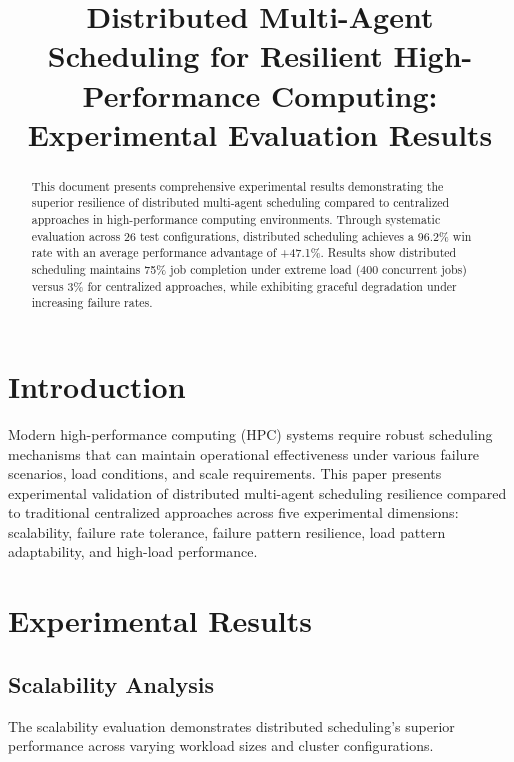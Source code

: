 \documentclass[conference]{IEEEtran}
\begin{document}
\title{Distributed Multi-Agent Scheduling for Resilient High-Performance Computing: Experimental Evaluation Results}

\author{
}

\maketitle

\begin{abstract}
This document presents comprehensive experimental results demonstrating the superior resilience of distributed multi-agent scheduling compared to centralized approaches in high-performance computing environments. Through systematic evaluation across 26 test configurations, distributed scheduling achieves a 96.2\% win rate with an average performance advantage of +47.1\%. Results show distributed scheduling maintains 75\% job completion under extreme load (400 concurrent jobs) versus 3\% for centralized approaches, while exhibiting graceful degradation under increasing failure rates.
\end{abstract}

\section{Introduction}

Modern high-performance computing (HPC) systems require robust scheduling mechanisms that can maintain operational effectiveness under various failure scenarios, load conditions, and scale requirements. This paper presents experimental validation of distributed multi-agent scheduling resilience compared to traditional centralized approaches across five experimental dimensions: scalability, failure rate tolerance, failure pattern resilience, load pattern adaptability, and high-load performance.

\section{Experimental Results}

\subsection{Scalability Analysis}

The scalability evaluation demonstrates distributed scheduling's superior performance across varying workload sizes and cluster configurations.
\end{document}
